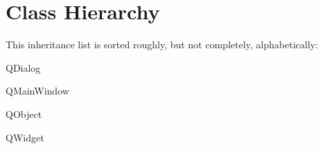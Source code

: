 \section{Class Hierarchy}
This inheritance list is sorted roughly, but not completely, alphabetically\+:\begin{DoxyCompactList}
\item Q\+Dialog\begin{DoxyCompactList}
\item {}
\item {}
\end{DoxyCompactList}
\item Q\+Main\+Window\begin{DoxyCompactList}
\item {}
\end{DoxyCompactList}
\item Q\+Object\begin{DoxyCompactList}
\item {}
\item {}
\item {}
\item {}
\begin{DoxyCompactList}
\item {}
\end{DoxyCompactList}
\end{DoxyCompactList}
\item Q\+Widget\begin{DoxyCompactList}
\item {}
\end{DoxyCompactList}
\end{DoxyCompactList}
